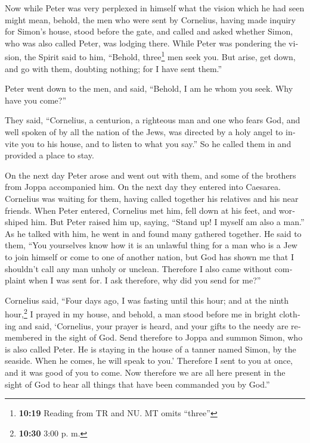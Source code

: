 \begin{paracol}{2}
\begin{otherlanguage}{english}
 Now while Peter was very perplexed in himself what the
vision which he had seen might mean, behold, the men who were sent by
Cornelius, having made inquiry for Simon's house, stood before the gate,
 and called and asked whether Simon, who was also called
Peter, was lodging there.  While Peter was pondering the
vision, the Spirit said to him, ``Behold, three\footnote{\textbf{10:19}
  Reading from TR and NU. MT omits ``three''} men seek you.
 But arise, get down, and go with them, doubting nothing;
for I have sent them.''

 Peter went down to the men, and said, ``Behold, I am he
whom you seek. Why have you come?''

 They said, ``Cornelius, a centurion, a righteous man and
one who fears God, and well spoken of by all the nation of the Jews, was
directed by a holy angel to invite you to his house, and to listen to
what you say.''  So he called them in and provided a
place to stay.

On the next day Peter arose and went out with them, and some of the
brothers from Joppa accompanied him.  On the next day
they entered into Caesarea. Cornelius was waiting for them, having
called together his relatives and his near friends.  When
Peter entered, Cornelius met him, fell down at his feet, and worshiped
him.  But Peter raised him up, saying, ``Stand up! I
myself am also a man.''  As he talked with him, he went
in and found many gathered together.  He said to them,
``You yourselves know how it is an unlawful thing for a man who is a Jew
to join himself or come to one of another nation, but God has shown me
that I shouldn't call any man unholy or unclean. 
Therefore I also came without complaint when I was sent for. I ask
therefore, why did you send for me?''

 Cornelius said, ``Four days ago, I was fasting until
this hour; and at the ninth hour,\footnote{\textbf{10:30} 3:00 p. m.} I
prayed in my house, and behold, a man stood before me in bright clothing
 and said, `Cornelius, your prayer is heard, and your
gifts to the needy are remembered in the sight of God. 
Send therefore to Joppa and summon Simon, who is also called Peter. He
is staying in the house of a tanner named Simon, by the seaside. When he
comes, he will speak to you.'  Therefore I sent to you at
once, and it was good of you to come. Now therefore we are all here
present in the sight of God to hear all things that have been commanded
you by God.''


\end{otherlanguage}
\end{paracol}
